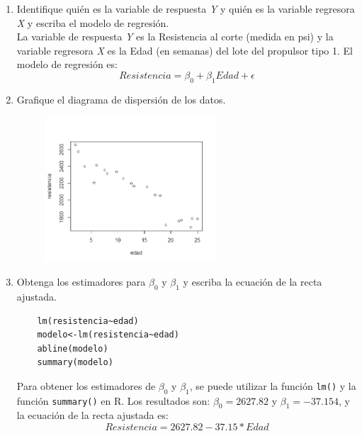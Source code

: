 \documentclass[12pt,a4paper]{article}
\begin{document}
\begin{enumerate}
  \item Identifique qui\'en es la variable de respuesta \textit{Y} y qui\'en es la variable regresora \textit{X} y escriba el modelo de regresi\'on.
  \\
  La variable de respuesta \textit{Y} es la Resistencia al corte (medida en psi) y la variable regresora \textit{X} es la Edad (en semanas) del lote del propulsor tipo 1. El modelo de regresi\'on es:
  \[ Resistencia = \beta_0 + \beta_1 Edad + \epsilon \]
  
  \item Grafique el diagrama de dispersi\'on de los datos.
  \begin{figure}[H]
    \centering
    \includegraphics[width=0.6\textwidth]{img/DiagramaDispersion.png}
  \end{figure}
  
  \newpage

  \item Obtenga los estimadores para $\beta_0$ y $\beta_1$ y escriba la ecuaci\'on de la recta ajustada.
  \begin{lstlisting}
    lm(resistencia~edad)
    modelo<-lm(resistencia~edad)
    abline(modelo)
    summary(modelo)
  \end{lstlisting}
  Para obtener los estimadores de $\beta_0$ y $\beta_1$, se puede utilizar la funci\'on \texttt{lm()} y la funci\'on \texttt{summary()} en R. Los resultados son: $\beta_0=2627.82$ y $\beta_1=-37.154$, y la ecuaci\'on de la recta ajustada es:
    \[ Resistencia = 2627.82 - 37.15*Edad \]


\end{enumerate}
\end{document}
